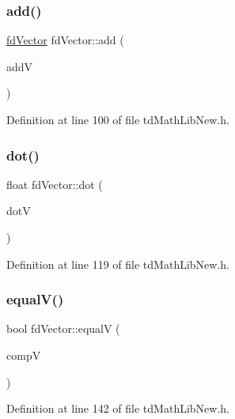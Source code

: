\subsubsection{\texorpdfstring{add()}{add()}}
{\footnotesize\ttfamily \hyperlink{classfd_vector}{fd\+Vector} fd\+Vector\+::add (\begin{DoxyParamCaption}\item[{\hyperlink{classfd_vector}{fd\+Vector}}]{addV }\end{DoxyParamCaption})\hspace{0.3cm}{\ttfamily [inline]}}



Definition at line 100 of file td\+Math\+Lib\+New.\+h.

\hypertarget{classfd_vector_abc99ed1ae023f50e3ef820ea22aa9eb1}{}\label{classfd_vector_abc99ed1ae023f50e3ef820ea22aa9eb1} 
\subsubsection{\texorpdfstring{dot()}{dot()}}
{\footnotesize\ttfamily float fd\+Vector\+::dot (\begin{DoxyParamCaption}\item[{\hyperlink{classfd_vector}{fd\+Vector}}]{dotV }\end{DoxyParamCaption})\hspace{0.3cm}{\ttfamily [inline]}}



Definition at line 119 of file td\+Math\+Lib\+New.\+h.

\hypertarget{classfd_vector_a860bf648b8f3c0ad6156cd28eb60c952}{}\label{classfd_vector_a860bf648b8f3c0ad6156cd28eb60c952} 
\subsubsection{\texorpdfstring{equal\+V()}{equalV()}}
{\footnotesize\ttfamily bool fd\+Vector\+::equalV (\begin{DoxyParamCaption}\item[{\hyperlink{classfd_vector}{fd\+Vector}}]{compV }\end{DoxyParamCaption})\hspace{0.3cm}{\ttfamily [inline]}}



Definition at line 142 of file td\+Math\+Lib\+New.\+h.

